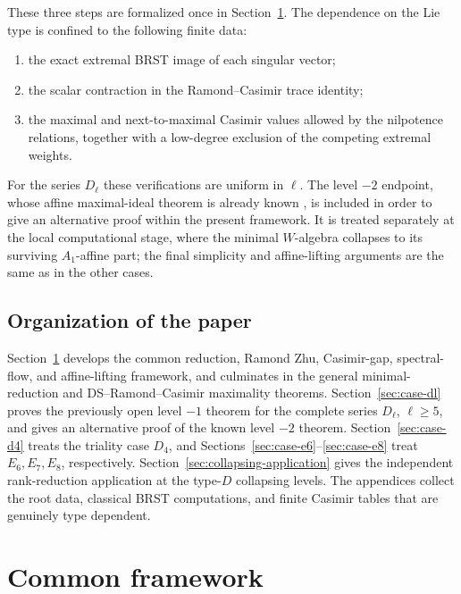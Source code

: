 \documentclass[11pt,reqno]{amsart}
\theoremstyle{definition}
\theoremstyle{remark}
\begin{document}
These three steps are formalized once in
Section~\ref{sec:common-framework}.  The dependence on the Lie type is
confined to the following finite data:
\begin{enumerate}
\item the exact extremal BRST image of each singular vector;
\item the scalar contraction in the Ramond--Casimir trace identity;
\item the maximal and next-to-maximal Casimir values allowed by the
      nilpotence relations, together with a low-degree exclusion of the
      competing extremal weights.
\end{enumerate}
For the series $D_\ell$ these verifications are uniform in $\ell$.  The
level $-2$ endpoint, whose affine maximal-ideal theorem is already known
\cite[Section~6, Corollary~6.6(1)]
{AdamovicKacMosenederFrajriaPapiPerse2020}, is included in order to give an
alternative proof within the present framework.  It is treated separately
at the local computational stage, where the minimal $W$-algebra collapses
to its surviving $A_1$-affine part; the final simplicity and affine-lifting
arguments are the same as in the other cases.

\subsection{Organization of the paper}

Section~\ref{sec:common-framework} develops the common reduction,
Ramond Zhu, Casimir-gap, spectral-flow, and affine-lifting framework, and
culminates in the general minimal-reduction and DS--Ramond--Casimir
maximality theorems.
Section~\ref{sec:case-dl} proves the previously open level $-1$ theorem for
the complete series $D_\ell$, $\ell\ge5$, and gives an alternative proof
of the known level $-2$ theorem.  Section~\ref{sec:case-d4} treats the
triality case $D_4$, and Sections~\ref{sec:case-e6}--\ref{sec:case-e8}
treat $E_6,E_7,E_8$, respectively.  Section~\ref{sec:collapsing-application}
gives the independent rank-reduction application at the type-$D$ collapsing
levels.  The appendices collect the root data, classical BRST computations,
and finite Casimir tables that are genuinely type dependent.
\section{Common framework}
\label{sec:common-framework}
\end{document}
